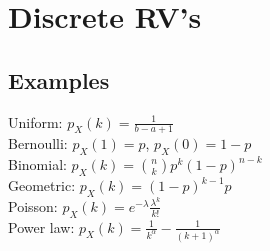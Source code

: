 \section{Discrete RV's}

	\subsection*{Examples}
	Uniform: $p_{X}\left(k\right) = \frac{1}{b - a + 1}$\\
	Bernoulli: $p_{X}\left(1\right) = p$, $p_{X}\left(0\right) = 1 - p$\\
	Binomial: $p_{X}\left(k\right) = \binom{n}{k}p^{k}\left(1 - p\right)^{n - k}$\\
	Geometric: $p_{X}\left(k\right) = \left(1 - p\right)^{k - 1}p$\\
	Poisson: $p_{X}\left(k\right) = e^{-\lambda}\frac{\lambda^{k}}{k!}$\\
	Power law: $p_{X}\left(k\right) = \frac{1}{k^{\alpha}} - \frac{1}{\left(k + 1\right)^{\alpha}}$
	